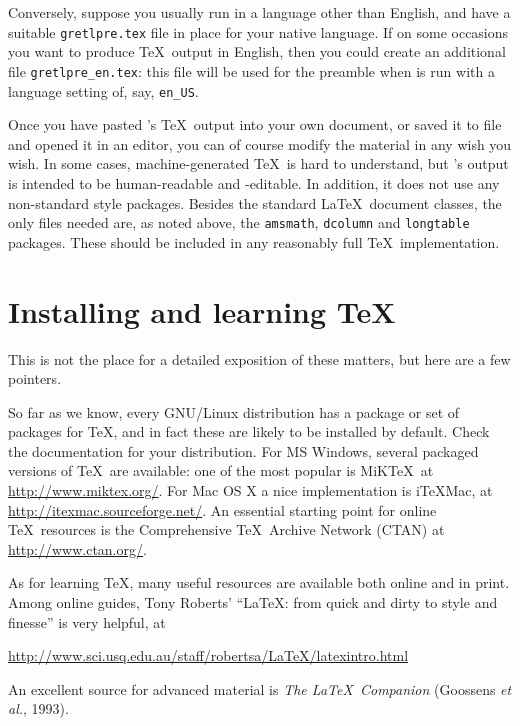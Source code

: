 Conversely, suppose you usually run  in a language other
than English, and have a suitable \verb|gretlpre.tex| file in place
for your native language.  If on some occasions you want to produce
\TeX\ output in English, then you could create an additional
file \verb|gretlpre_en.tex|: this file will be used for the preamble
when  is run with a language setting of, say,
\verb|en_US|.  

Once you have pasted 's \TeX\ output into your own
document, or saved it to file and opened it in an editor, you can of
course modify the material in any wish you wish.  In some cases,
machine-generated \TeX\ is hard to understand, but 's
output is intended to be human-readable and -editable.  In addition,
it does not use any non-standard style packages.  Besides the standard
\LaTeX\ document classes, the only files needed are, as noted above,
the \verb+amsmath+, \verb+dcolumn+ and \verb+longtable+ packages.
These should be included in any reasonably full \TeX\ implementation.


\section{Installing and learning \TeX}
\label{tex-install}

This is not the place for a detailed exposition of these matters, but
here are a few pointers.  

So far as we know, every GNU/Linux distribution has a package or set
of packages for \TeX, and in fact these are likely to be installed by
default.  Check the documentation for your distribution.  For MS
Windows, several packaged versions of \TeX\ are available: one of the
most popular is MiK\TeX\, at \url{http://www.miktex.org/}.  For Mac OS
X a nice implementation is i\TeX{}Mac, at
\url{http://itexmac.sourceforge.net/}.  An essential starting point for
online \TeX\ resources is the Comprehensive
\TeX\ Archive Network (CTAN) at \url{http://www.ctan.org/}.

As for learning \TeX, many useful resources are available both online
and in print.  Among online guides, Tony Roberts' ``\LaTeX: from quick
and dirty to style and finesse'' is very helpful, at

\url{http://www.sci.usq.edu.au/staff/robertsa/LaTeX/latexintro.html}

An excellent source for advanced material is \emph{The \LaTeX\
  Companion} (Goossens \textit{et al.}, 1993).


